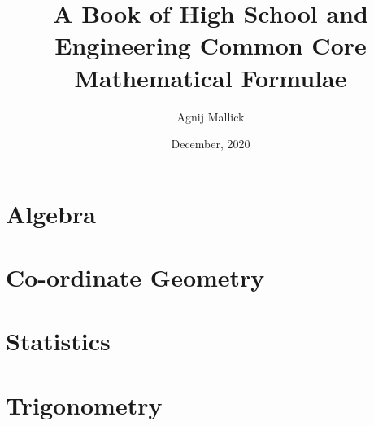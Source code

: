 \documentclass[openany, oneside]{book}
\title{A Book of High School and Engineering Common Core Mathematical Formulae}
\date{December, 2020}
\author{Agnij Mallick}
\begin{document}
	\maketitle
	\tableofcontents

	\part{Algebra}
		
		
		
		
		
		
		
		
		
		
	\part{Co-ordinate Geometry}
		
		
		
		
		
		
		
		
		

	\part{Statistics}
		
		
		
		
		
		

	\part{Trigonometry}
		
		
\end{document}
